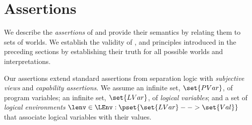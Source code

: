 \section{\colosl Assertions}\label{sec:assertions}
We describe the \emph{assertions} of \colosl and provide their semantics by relating them to sets of worlds. We establish the validity of \copyRule, \forgetRule and \mergeRule principles introduced in the preceding sections by establishing their truth for all possible worlds and interpretations.

Our assertions extend standard assertions from separation logic with \emph{subjective views} and \emph{capability assertions}. 
We assume an infinite set, $\set{PVar}$, of program variables; an infinite set, $\set{LVar}$, of \emph{logical variables}; and a set of \emph{logical environments} $\lenv \in \LEnv: \pset{\set{LVar} --> \set{Val}}$ that associate logical variables with their values.

